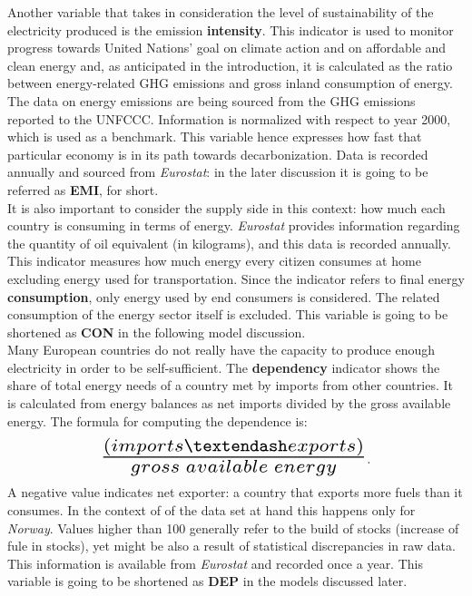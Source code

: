 \documentclass{book}
\begin{document}
\noindent Another variable that takes in consideration the level of sustainability of the electricity produced is the emission \textbf{intensity}. This indicator is used to monitor progress towards United Nations' goal on climate action and on affordable and clean energy and, as anticipated in the introduction, it is calculated as the ratio between energy-related GHG emissions and gross inland consumption of energy. The data on energy emissions are being sourced from the GHG emissions reported to the UNFCCC. Information is normalized with respect to year 2000, which is used as a benchmark. This variable hence expresses how fast that particular economy is in its path towards decarbonization. Data is recorded annually and sourced from \textit{Eurostat}: in the later discussion it is going to be referred as \textbf{EMI}, for short.\\

\noindent It is also important to consider the supply side in this context: how much each country is consuming in terms of energy. \textit{Eurostat} provides information regarding the quantity of oil equivalent (in kilograms), and this data is recorded annually. This indicator measures how much energy every citizen consumes at home excluding energy used for transportation. Since the indicator refers to final energy \textbf{consumption}, only energy used by end consumers is considered. The related consumption of the energy sector itself is excluded. This variable is going to be shortened as \textbf{CON} in the following model discussion.\\

\noindent Many European countries do not really have the capacity to produce enough electricity in order to be self-sufficient. The \textbf{dependency} indicator shows the share of total energy needs of a country met by imports from other countries. It is calculated from energy balances as net imports divided by the gross available energy. The formula for computing the dependence is: $$ \scalebox{2} {$\frac{(imports – exports)}{gross\;available\;energy}$}.$$ A negative value indicates net exporter: a country that exports more fuels than it consumes. In the context of of the data set at hand this happens only for \textit{Norway}. Values higher than 100 generally refer to the build of stocks (increase of fule in stocks), yet might be also a result of statistical discrepancies in raw data. This information is available from \textit{Eurostat} and recorded once a year. This variable is going to be shortened as \textbf{DEP} in the models discussed later.\\
\end{document}
